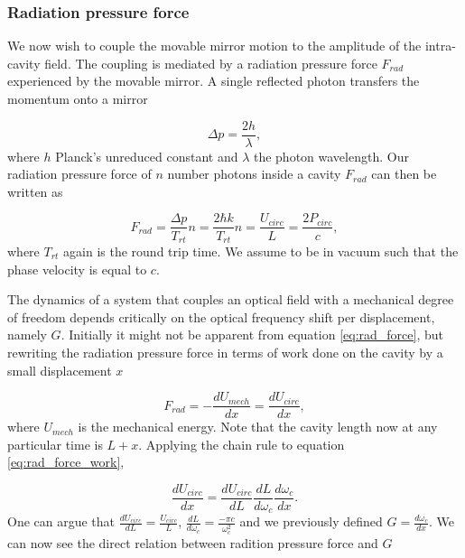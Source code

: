 \subsubsection{Radiation pressure force}
We now wish to couple the movable mirror motion to the amplitude of the intra-cavity field. The coupling is mediated by a radiation pressure force $F_{rad}$ experienced by the movable mirror. A single reflected photon transfers the momentum onto a mirror

\begin{equation}
\Delta p = \frac{2h}{\lambda},
\end{equation}
\noindent
where $h$ Planck's unreduced constant and $\lambda$ the photon wavelength. Our radiation pressure force of $n$ number photons inside a cavity $F_{rad}$ can then be written as

\begin{equation}
F_{rad} = \frac{\Delta p}{T_{rt}}n = \frac{2\hbar k}{T_{rt}}n = \frac{U_{circ}}{L} = \frac{2P_{circ}}{c},
\label{eq:rad_force}
\end{equation}
\noindent
where $T_{rt}$ again is the round trip time. We assume to be in vacuum such that the phase velocity is equal to $c$.%

The dynamics of a system that couples an optical field with a mechanical degree of freedom depends critically on the optical frequency shift per displacement, namely $G$. Initially it might not be apparent from equation \eqref{eq:rad_force}, but rewriting the radiation pressure force in terms of work done on the cavity by a small displacement $x$

\begin{equation}
F_{rad} = -\frac{d U_{mech}}{dx} = \frac{d U_{circ}}{dx},
\label{eq:rad_force_work}
\end{equation}
\noindent
where $U_{mech}$ is the mechanical energy. Note that the cavity length now at any particular time is $L + x$. Applying the chain rule to equation \eqref{eq:rad_force_work},

\begin{equation}
\frac{d U_{circ}}{dx} = \frac{d U_{circ}}{dL}\frac{d L}{d\omega_c}\frac{d\omega_c}{dx}.
\end{equation}
\noindent
One can argue that $\frac{d U_{circ}}{dL} = \frac{U_{circ}}{L}$, $\frac{dL}{d\omega_c} = \frac{-\pi c}{\omega_c^2}$ and we previously defined $G = \frac{d\omega_c}{dx}$. We can now see the direct relation between radition pressure force and $G$

